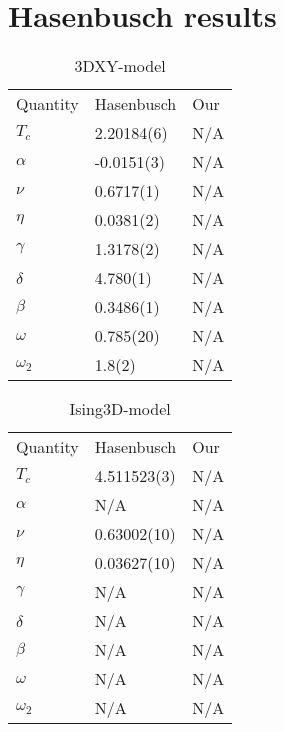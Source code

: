 \documentclass[a4paper]{article}
\begin{document}
\section{Hasenbusch results}
\begin{table}[htpb]
\begin{center}
\begin{tabular}{l l l}
  Quantity & Hasenbusch & Our\\
  $T_c$	& 2.20184(6) & N/A\\
  $\alpha $	& -0.0151(3) & N/A\\
  $\nu	  $      & 0.6717(1) & N/A\\
  $\eta   $      & 0.0381(2) & N/A\\
  $\gamma $	& 1.3178(2) & N/A\\
  $\delta $	& 4.780(1) & N/A\\
  $\beta  $      & 0.3486(1) & N/A\\
  $\omega $      & 0.785(20) & N/A\\
  $\omega_2$ 	& 1.8(2) & N/A\\
\end{tabular}
\end{center}
\caption{3DXY-model }
\end{table}
\begin{table}[htpb]
\begin{center}
\begin{tabular}{l l l}
  Quantity  & Hasenbusch & Our\\
  $T_c$	    & 4.511523(3)& N/A\\
  $\alpha $ & N/A        & N/A\\
  $\nu	  $ & 0.63002(10)& N/A\\
  $\eta   $ & 0.03627(10)& N/A\\
  $\gamma $ & N/A        & N/A\\
  $\delta $ & N/A        & N/A\\
  $\beta  $ & N/A        & N/A\\
  $\omega $ & N/A        & N/A\\
  $\omega_2$& N/A        & N/A\\
\end{tabular}
\end{center}
\caption{Ising3D-model }
\end{table}
\end{document}
